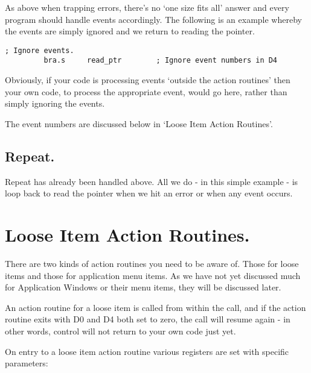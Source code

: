 As above when trapping errors, there's no `one size fits all'
      answer and every program should handle events accordingly. The following
      is an example whereby the events are simply ignored and we return to
      reading the pointer.

\begin{lstlisting}[firstnumber=last,caption={EasyPEasy Standard Code - Ignore Events},label={lst:EasyPEasy-9}]
; Ignore events.
         bra.s     read_ptr        ; Ignore event numbers in D4
\end{lstlisting}

Obviously, if your code is processing events `outside the action
      routines' then your own code, to process the appropriate event, would go
      here, rather than simply ignoring the events.

The event numbers are discussed below in `Loose Item Action
      Routines'.

\subsection{Repeat.}

Repeat has already been handled above. All we do -{} in this simple
      example -{} is loop back to read the pointer when we hit an error or when
      any event occurs.

\section{Loose Item Action Routines.}

There are two kinds of action routines you need to be aware of.
    Those for loose items and those for application menu items. As we have not
    yet discussed much for Application Windows or their menu items, they will
    be discussed later.

An action routine for a loose item is called from within the 
    call, and if the action routine exits with D0 and D4 both set to zero, the
     call will resume again -{} in other words, control will not return
    to your own code just yet.

On entry to a loose item action routine various registers are set
    with specific parameters:


